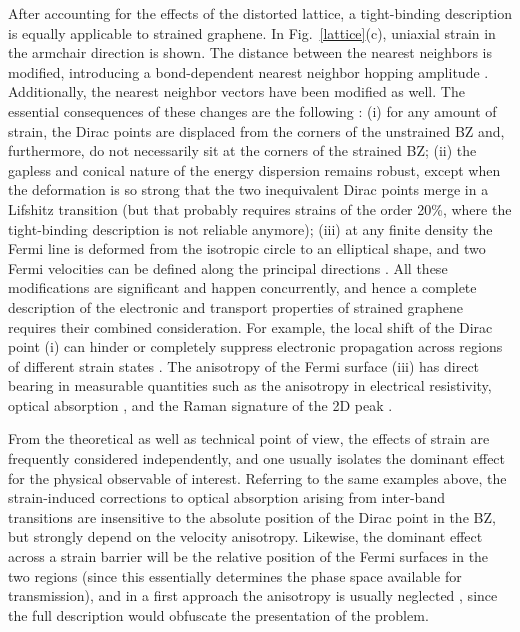 After accounting for the effects of the distorted lattice, a tight-binding description is equally applicable to strained graphene.
In Fig.~\ref{lattice}(c), uniaxial strain in the armchair direction is shown.
The distance between the nearest neighbors is modified, introducing a bond-dependent nearest neighbor hopping amplitude \cite{Hasegawa2006}.
Additionally, the nearest neighbor vectors have been modified as well.
The essential consequences of these changes are the following \cite{Pereira2009}:
(i) for any amount of strain, the Dirac points are displaced from the corners of the unstrained BZ and, furthermore, do not necessarily sit at the corners of the strained BZ;
(ii) the gapless and conical nature of the energy dispersion remains robust, except when the deformation is so strong that the two inequivalent Dirac points merge in a Lifshitz transition (but that probably requires strains of the order 20\%, where the tight-binding description is not reliable anymore);
(iii) at any finite density the Fermi line is deformed from the isotropic circle to an elliptical shape, and two Fermi velocities can be defined along the principal directions \cite{Pereira2009,Pereira2010c,Choi2010}.
All these modifications are significant and happen concurrently, and hence a complete description of the electronic and transport properties of strained graphene requires their combined consideration.
For example, the local shift of the Dirac point (i) can hinder or completely suppress electronic propagation across regions of different strain states \cite{Pereira2009a,Fogler2008}.
The anisotropy of the Fermi surface (iii) has direct bearing in measurable quantities such as the anisotropy in electrical resistivity\cite{Kim2009}, optical absorption \cite{Pereira2010c,Pellegrino2010}, and the Raman signature of the 2D peak \cite{Huang2010,Mohr2010a,Frank2011,Yoon2011}.

From the theoretical as well as technical point of view, the effects of strain are frequently considered independently, and one usually isolates the dominant effect for the physical observable of interest.
Referring to the same examples above, the strain-induced corrections to optical absorption arising from inter-band transitions are insensitive to the absolute position of the Dirac point in the BZ, but strongly depend on the velocity anisotropy\cite{Pereira2010c,Pellegrino2010}.
Likewise, the dominant effect across a strain barrier will be the relative position of the Fermi surfaces in the two regions (since this essentially determines the phase space available for transmission), and in a first approach the anisotropy is usually neglected \cite{Fogler2008,Pereira2009a}, since the full description would obfuscate the presentation of the problem.

